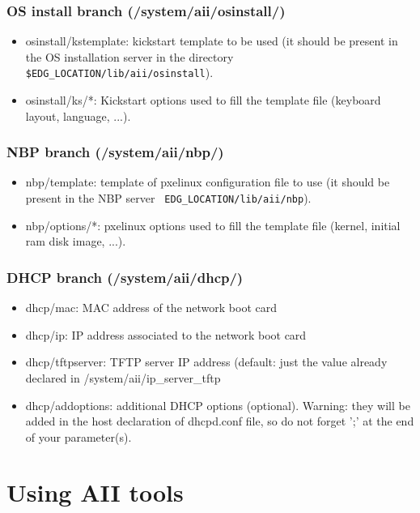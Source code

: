 \documentclass{datagridreport}
\begin{document}
\subsection{OS install branch (/system/aii/osinstall/)}
\begin{itemize}
\item osinstall/kstemplate: kickstart template to be used (it should be present in the OS
      installation server in the directory \texttt{\$EDG\_LOCATION/lib/aii/osinstall}).
\item osinstall/ks/*: Kickstart options used to fill the
      template file (keyboard layout, language, ...).
\end{itemize}

\subsection{NBP branch (/system/aii/nbp/)}
\begin{itemize}
\item nbp/template: template of pxelinux configuration file to use (it should be
      present in the NBP server \texttt{\ EDG\_LOCATION/lib/aii/nbp}).
\item nbp/options/*: pxelinux options used to fill the template file (kernel, initial ram disk
      image, ...).
\end{itemize}

\subsection{DHCP branch (/system/aii/dhcp/)}
\begin{itemize}
\item dhcp/mac: MAC address of the network boot card
\item dhcp/ip: IP address associated to the network boot card
\item dhcp/tftpserver: TFTP server IP address (default: just
      the value already declared in /system/aii/ip\_server\_tftp
\item dhcp/addoptions: additional DHCP options (optional). Warning: they will be added
      in the host declaration of dhcpd.conf file, so do not forget ';' at the end of
      your parameter(s).
\end{itemize}


\chapter{Using AII tools} \label{installingnodes}
\end{document}
